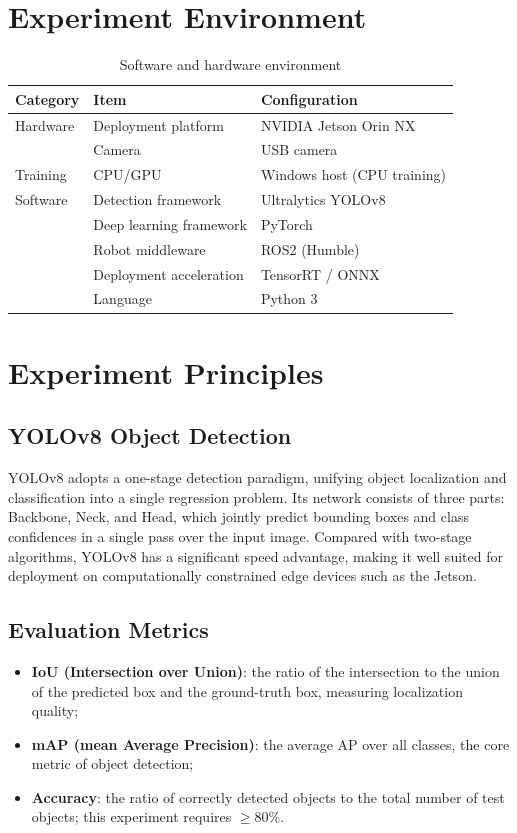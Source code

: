 \documentclass[12pt, a4paper]{article}
\begin{document}
\section{Experiment Environment}
\begin{table}[H]
    \centering
    \begin{tabular}{@{}lll@{}}
        \toprule
        \textbf{Category} & \textbf{Item} & \textbf{Configuration} \\
        \midrule
        Hardware & Deployment platform & NVIDIA Jetson Orin NX \\
                 & Camera & USB camera \\
        Training & CPU/GPU & Windows host (CPU training) \\
        Software & Detection framework & Ultralytics YOLOv8 \\
                 & Deep learning framework & PyTorch \\
                 & Robot middleware & ROS2 (Humble) \\
                 & Deployment acceleration & TensorRT / ONNX \\
                 & Language & Python 3 \\
        \bottomrule
    \end{tabular}
    \caption{Software and hardware environment}
\end{table}

\section{Experiment Principles}
\subsection{YOLOv8 Object Detection}
YOLOv8 adopts a one-stage detection paradigm, unifying object localization and
classification into a single regression problem. Its network consists of three parts:
Backbone, Neck, and Head, which jointly predict bounding boxes and class confidences
in a single pass over the input image. Compared with two-stage algorithms, YOLOv8
has a significant speed advantage, making it well suited for deployment on
computationally constrained edge devices such as the Jetson.

\subsection{Evaluation Metrics}
\begin{itemize}[leftmargin=2em]
    \item \textbf{IoU (Intersection over Union)}: the ratio of the intersection to the union of the predicted box and the ground-truth box, measuring localization quality;
    \item \textbf{mAP (mean Average Precision)}: the average AP over all classes, the core metric of object detection;
    \item \textbf{Accuracy}: the ratio of correctly detected objects to the total number of test objects; this experiment requires $\geq 80\%$.
\end{itemize}
\end{document}
